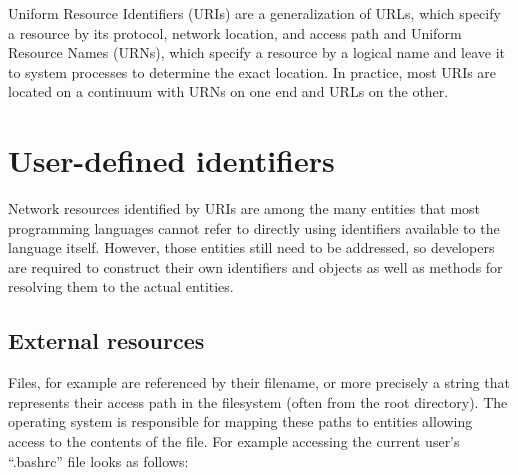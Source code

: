 \documentclass[preprint,authoryear]{acm_proc_article-sp}
\begin{document}
Uniform Resource Identifiers (URIs) are a generalization of URLs, which specify a
resource by its protocol, network location, and access path and Uniform Resource Names (URNs),
which specify
a resource by a logical name and leave it to system processes to 
determine the exact location.  In practice, most URIs are located on
a continuum with URNs on one end and URLs on the other.


\section{User-defined identifiers}
\label{user-defined-identifiers}

Network resources identified by URIs are among the many entities that most
programming languages cannot refer to directly using identifiers available to the
language itself.
However, those entities still need to be addressed, so developers are required
to construct their own identifiers  and objects as well as methods for resolving them to the actual
entities.

\subsection{External resources}

Files, for example are referenced by their filename, or more precisely
a string that represents their access path in the filesystem (often from the root 
directory).  The operating system is responsible for mapping these
paths to entities allowing access to the contents of the file.  For example accessing
the current user's ``.bashrc'' file looks as follows:

\end{document}
